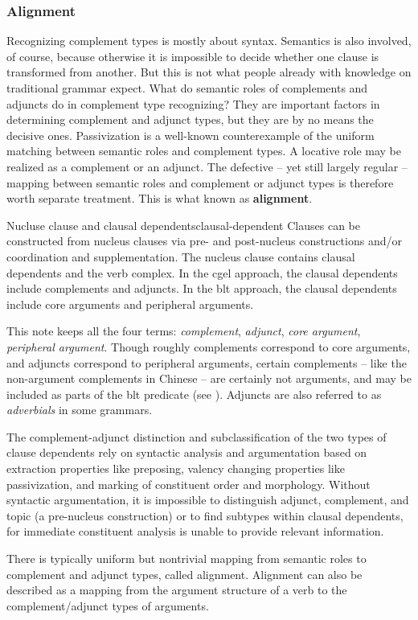 \documentclass[UTF8, a4paper, oneside, scheme=plain]{ctexart}
\newcommand*{\concept}[1]{\textbf{#1}}
\newcommand*{\term}[1]{\emph{#1}}
\begin{document}
\subsubsection{Alignment}\label{sec:alignment}

Recognizing complement types is mostly about syntax.
Semantics is also involved, of course, 
because otherwise it is impossible to decide whether one clause is transformed from another.
But this is not what people already with knowledge on traditional grammar expect.
What do semantic roles of complements and adjuncts 
do in complement type recognizing?
They are important factors in determining complement and adjunct types,
but they are by no means the decisive ones.
Passivization is a well-known counterexample of the uniform matching between semantic roles and complement types.
A locative role may be realized as a complement or an adjunct.
The defective -- yet still largely regular -- mapping between semantic roles and complement or adjunct types 
is therefore worth separate treatment.
This is what known as \concept{alignment}.

\begin{infobox}{Nucluse clause and clausal dependents}{clausal-dependent}
    Clauses can be constructed from nucleus clauses via pre- and post-nucleus constructions 
    and/or coordination and supplementation.
    The nucleus clause contains clausal dependents and the verb complex.
    In the \ac{cgel} approach, the clausal dependents include complements and adjuncts.
    In the \ac{blt} approach, the clausal dependents include core arguments and peripheral arguments.

    This note keeps all the four terms: \term{complement}, \term{adjunct}, 
    \term{core argument}, \term{peripheral argument}.
    Though roughly complements correspond to core arguments,
    and adjuncts correspond to peripheral arguments,
    certain complements -- like the non-argument complements in Chinese -- 
    are certainly not arguments, and may be included as parts of the \ac{blt} predicate 
    (see ).
    Adjuncts are also referred to as \term{adverbials} in some grammars.

    The complement-adjunct distinction and subclassification of the two types of clause dependents 
    rely on syntactic analysis and argumentation 
    based on extraction properties like preposing,
    valency changing properties like passivization,
    and marking of constituent order and morphology.
    Without syntactic argumentation, 
    it is impossible to distinguish adjunct, complement, and topic (a pre-nucleus construction) 
    or to find subtypes within clausal dependents,
    for immediate constituent analysis is unable to provide relevant information.
    
    There is typically uniform but nontrivial mapping from semantic roles to complement and adjunct types,
    called alignment.
    Alignment can also be described as a mapping from the argument structure of a verb 
    to the complement/adjunct types of arguments. 
\end{infobox}
\end{document}
